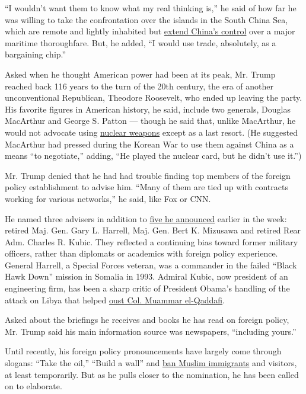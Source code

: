 ``I wouldn't want them to know what my real thinking is,'' he said of
how far he was willing to take the confrontation over the islands in the
South China Sea, which are remote and lightly inhabited but
\href{http://www.nytimes.com/2016/03/09/world/asia/south-china-sea-militarization.html}{extend
China's control} over a major maritime thoroughfare. But, he added, ``I
would use trade, absolutely, as a bargaining chip.''

Asked when he thought American power had been at its peak, Mr. Trump
reached back 116 years to the turn of the 20th century, the era of
another unconventional Republican, Theodore Roosevelt, who ended up
leaving the party. His favorite figures in American history, he said,
include two generals, Douglas MacArthur and George S. Patton --- though
he said that, unlike MacArthur, he would not advocate using
\href{http://topics.nytimes.com/top/news/science/topics/atomic_weapons/index.html?inline=nyt-classifier}{nuclear
weapons} except as a last resort. (He suggested MacArthur had pressed
during the Korean War to use them against China as a means ``to
negotiate,'' adding, ``He played the nuclear card, but he didn't use
it.'')

Mr. Trump denied that he had had trouble finding top members of the
foreign policy establishment to advise him. ``Many of them are tied up
with contracts working for various networks,'' he said, like Fox or CNN.

He named three advisers in addition to
\href{http://www.nytimes.com/2016/03/23/us/politics/donald-trump-foreign-policy-advisers.html}{five
he announced} earlier in the week: retired Maj. Gen. Gary L. Harrell,
Maj. Gen. Bert K. Mizusawa and retired Rear Adm. Charles R. Kubic. They
reflected a continuing bias toward former military officers, rather than
diplomats or academics with foreign policy experience. General Harrell,
a Special Forces veteran, was a commander in the failed ``Black Hawk
Down'' mission in Somalia in 1993. Admiral Kubic, now president of an
engineering firm, has been a sharp critic of President Obama's handling
of the attack on Libya that helped
\href{http://www.nytimes.com/2011/10/21/world/africa/qaddafi-killed-as-hometown-falls-to-libyan-rebels.html}{oust
Col. Muammar el-Qaddafi}.

Asked about the briefings he receives and books he has read on foreign
policy, Mr. Trump said his main information source was newspapers,
``including yours.''

Until recently, his foreign policy pronouncements have largely come
through slogans: ``Take the oil,'' ``Build a wall'' and
\href{http://www.nytimes.com/politics/first-draft/2015/12/07/donald-trump-calls-for-banning-muslims-from-entering-u-s/}{ban
Muslim immigrants} and visitors, at least temporarily. But as he pulls
closer to the nomination, he has been called on to elaborate.

